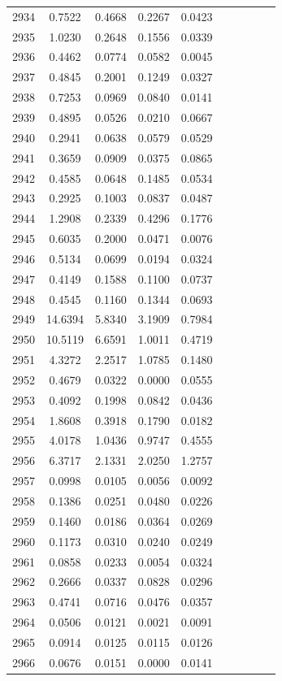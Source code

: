 \begin{table}
\begin{tabular}{cccccccccc}
2934& 0.7522& 0.4668& 0.2267& 0.0423\\ 
2935& 1.0230& 0.2648& 0.1556& 0.0339\\ 
2936& 0.4462& 0.0774& 0.0582& 0.0045\\ 
2937& 0.4845& 0.2001& 0.1249& 0.0327\\ 
2938& 0.7253& 0.0969& 0.0840& 0.0141\\ 
2939& 0.4895& 0.0526& 0.0210& 0.0667\\ 
2940& 0.2941& 0.0638& 0.0579& 0.0529\\ 
2941& 0.3659& 0.0909& 0.0375& 0.0865\\ 
2942& 0.4585& 0.0648& 0.1485& 0.0534\\ 
2943& 0.2925& 0.1003& 0.0837& 0.0487\\ 
2944& 1.2908& 0.2339& 0.4296& 0.1776\\ 
2945& 0.6035& 0.2000& 0.0471& 0.0076\\ 
2946& 0.5134& 0.0699& 0.0194& 0.0324\\ 
2947& 0.4149& 0.1588& 0.1100& 0.0737\\ 
2948& 0.4545& 0.1160& 0.1344& 0.0693\\ 
2949& 14.6394& 5.8340& 3.1909& 0.7984\\ 
2950& 10.5119& 6.6591& 1.0011& 0.4719\\ 
2951& 4.3272& 2.2517& 1.0785& 0.1480\\ 
2952& 0.4679& 0.0322& 0.0000& 0.0555\\ 
2953& 0.4092& 0.1998& 0.0842& 0.0436\\ 
2954& 1.8608& 0.3918& 0.1790& 0.0182\\ 
2955& 4.0178& 1.0436& 0.9747& 0.4555\\ 
2956& 6.3717& 2.1331& 2.0250& 1.2757\\ 
2957& 0.0998& 0.0105& 0.0056& 0.0092\\ 
2958& 0.1386& 0.0251& 0.0480& 0.0226\\ 
2959& 0.1460& 0.0186& 0.0364& 0.0269\\ 
2960& 0.1173& 0.0310& 0.0240& 0.0249\\ 
2961& 0.0858& 0.0233& 0.0054& 0.0324\\ 
2962& 0.2666& 0.0337& 0.0828& 0.0296\\ 
2963& 0.4741& 0.0716& 0.0476& 0.0357\\ 
2964& 0.0506& 0.0121& 0.0021& 0.0091\\ 
2965& 0.0914& 0.0125& 0.0115& 0.0126\\ 
2966& 0.0676& 0.0151& 0.0000& 0.0141\\ 

\end{tabular}
\end{table}
